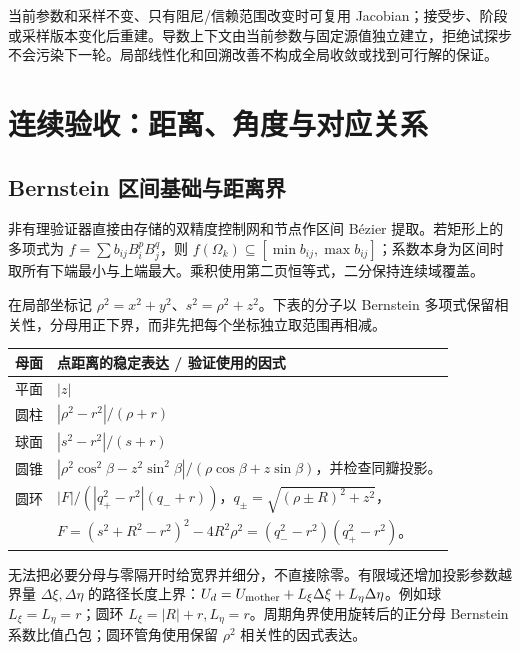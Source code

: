 \begin{center}\end{center}
当前参数和采样不变、只有阻尼/信赖范围改变时可复用 Jacobian；接受步、阶段或采样版本变化后重建。导数上下文由当前参数与固定源值独立建立，拒绝试探步不会污染下一轮。局部线性化和回溯改善不构成全局收敛或找到可行解的保证。

\clearpage
\section{连续验收：距离、角度与对应关系}
\subsection{Bernstein 区间基础与距离界}
非有理验证器直接由存储的双精度控制网和节点作区间 Bézier 提取。若矩形上的多项式为 $f=\sum b_{ij}B_i^pB_j^q$，则 $f(\Omega_k)\subseteq[\min b_{ij},\max b_{ij}]$；系数本身为区间时取所有下端最小与上端最大。乘积使用第二页恒等式，二分保持连续域覆盖。

在局部坐标记 $\rho^2=x^2+y^2$、$s^2=\rho^2+z^2$。下表的分子以 Bernstein 多项式保留相关性，分母用正下界，而非先把每个坐标独立取范围再相减。
\par{\small\begin{tabularx}{\linewidth}{@{}l Y@{}}\toprule
母面 & 点距离的稳定表达 / 验证使用的因式\\\midrule
平面 & $|z|$\\
圆柱 & $|\rho^2-r^2|/(\rho+r)$\\
球面 & $|s^2-r^2|/(s+r)$\\
圆锥 & $|\rho^2\cos^2\beta-z^2\sin^2\beta|/(\rho\cos\beta+z\sin\beta)$，并检查同瓣投影。\\
圆环 & $|F|/(|q_+^2-r^2|(q_-+r))$，$q_\pm=\sqrt{(\rho\pm R)^2+z^2}$，\\
 & $F=(s^2+R^2-r^2)^2-4R^2\rho^2=(q_-^2-r^2)(q_+^2-r^2)$。\\\bottomrule
\end{tabularx}}
无法把必要分母与零隔开时给宽界并细分，不直接除零。有限域还增加投影参数越界量 $\Delta\xi,\Delta\eta$ 的路径长度上界：$U_d=U_{\rm mother}+L_\xi\Delta\xi+L_\eta\Delta\eta$。例如球 $L_\xi=L_\eta=r$；圆环 $L_\xi=|R|+r,L_\eta=r$。周期角界使用旋转后的正分母 Bernstein 系数比值凸包；圆环管角使用保留 $\rho^2$ 相关性的因式表达。

